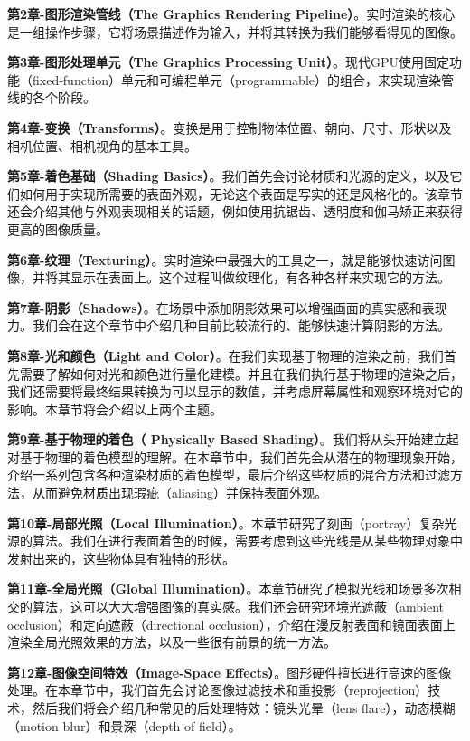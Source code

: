 \documentclass[
  paper=a4,
  ,captions=tableheading
]{scrartcl}
\begin{document}
\textbf{第2章-图形渲染管线（The Graphics Rendering
Pipeline）}。实时渲染的核心是一组操作步骤，它将场景描述作为输入，并将其转换为我们能够看得见的图像。

\textbf{第3章-图形处理单元（The Graphics Processing
Unit）}。现代GPU使用固定功能（fixed-function）单元和可编程单元（programmable）的组合，来实现渲染管线的各个阶段。

\textbf{第4章-变换（Transforms）}。变换是用于控制物体位置、朝向、尺寸、形状以及相机位置、相机视角的基本工具。

\textbf{第5章-着色基础（Shading
Basics）}。我们首先会讨论材质和光源的定义，以及它们如何用于实现所需要的表面外观，无论这个表面是写实的还是风格化的。该章节还会介绍其他与外观表现相关的话题，例如使用抗锯齿、透明度和伽马矫正来获得更高的图像质量。

\textbf{第6章-纹理（Texturing）}。实时渲染中最强大的工具之一，就是能够快速访问图像，并将其显示在表面上。这个过程叫做纹理化，有各种各样来实现它的方法。

\textbf{第7章-阴影（Shadows）}。在场景中添加阴影效果可以增强画面的真实感和表现力。我们会在这个章节中介绍几种目前比较流行的、能够快速计算阴影的方法。

\textbf{第8章-光和颜色（Light and
Color）}。在我们实现基于物理的渲染之前，我们首先需要了解如何对光和颜色进行量化建模。并且在我们执行基于物理的渲染之后，我们还需要将最终结果转换为可以显示的数值，并考虑屏幕属性和观察环境对它的影响。本章节将会介绍以上两个主题。

\textbf{第9章-基于物理的着色（ Physically Based
Shading）}。我们将从头开始建立起对基于物理的着色模型的理解。在本章节中，我们首先会从潜在的物理现象开始，介绍一系列包含各种渲染材质的着色模型，最后介绍这些材质的混合方法和过滤方法，从而避免材质出现瑕疵（aliasing）并保持表面外观。

\textbf{第10章-局部光照（Local
Illumination）}。本章节研究了刻画（portray）复杂光源的算法。我们在进行表面着色的时候，需要考虑到这些光线是从某些物理对象中发射出来的，这些物体具有独特的形状。

\textbf{第11章-全局光照（Global
Illumination）}。本章节研究了模拟光线和场景多次相交的算法，这可以大大增强图像的真实感。我们还会研究环境光遮蔽（ambient
occlusion）和定向遮蔽（directional
occlusion），介绍在漫反射表面和镜面表面上渲染全局光照效果的方法，以及一些很有前景的统一方法。

\textbf{第12章-图像空间特效（Image-Space
Effects）}。图形硬件擅长进行高速的图像处理。在本章节中，我们首先会讨论图像过滤技术和重投影（reprojection）技术，然后我们将会介绍几种常见的后处理特效：镜头光晕（lens
flare），动态模糊（motion blur）和景深（depth of field）。
\end{document}
